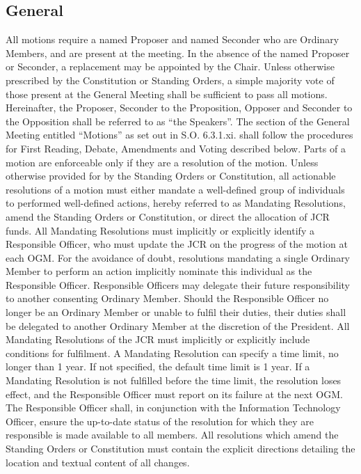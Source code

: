 \subsection{General}
\npara All motions require a named Proposer and named Seconder who are Ordinary Members, and are present at the meeting. In the absence of the named Proposer or Seconder, a replacement may be appointed by the Chair.
\npara Unless otherwise prescribed by the Constitution or Standing Orders, a simple majority vote of those present at the General Meeting shall be sufficient to pass all motions.
\npara Hereinafter, the Proposer, Seconder to the Proposition, Opposer and Seconder to the Opposition shall be referred to as ``the Speakers''.
\npara The section of the General Meeting entitled ``Motions'' as set out in S.O. 6.3.1.xi. shall follow the procedures for First Reading, Debate, Amendments and Voting described below.
\npara Parts of a motion are enforceable only if they are a resolution of the motion.
\npara Unless otherwise provided for by the Standing Orders or Constitution, all actionable resolutions of a motion must either mandate a well-defined group of individuals to performed well-defined actions, hereby referred to as Mandating Resolutions, amend the Standing Orders or Constitution, or direct the allocation of JCR funds.
\npara All Mandating Resolutions must implicitly or explicitly identify a Responsible Officer, who must update the JCR on the progress of the motion at each OGM. For the avoidance of doubt, resolutions mandating a single Ordinary Member to perform an action implicitly nominate this individual as the Responsible Officer.
\npara Responsible Officers may delegate their future responsibility to another consenting Ordinary Member. Should the Responsible Officer no longer be an Ordinary Member or unable to fulfil their duties, their duties shall be delegated to another Ordinary Member at the discretion of the President.
\npara All Mandating Resolutions of the JCR must implicitly or explicitly include conditions for fulfilment.
\npara A Mandating Resolution can specify a time limit, no longer than 1 year. If not specified, the default time limit is 1 year.
\npara If a Mandating Resolution is not fulfilled before the time limit, the resolution loses effect, and the Responsible Officer must report on its failure at the next OGM.
\npara The Responsible Officer shall, in conjunction with the Information Technology Officer, ensure the up-to-date status of the resolution for which they are responsible is made available to all members.
\npara All resolutions which amend the Standing Orders or Constitution must contain the explicit directions detailing the location and textual content of all changes.

